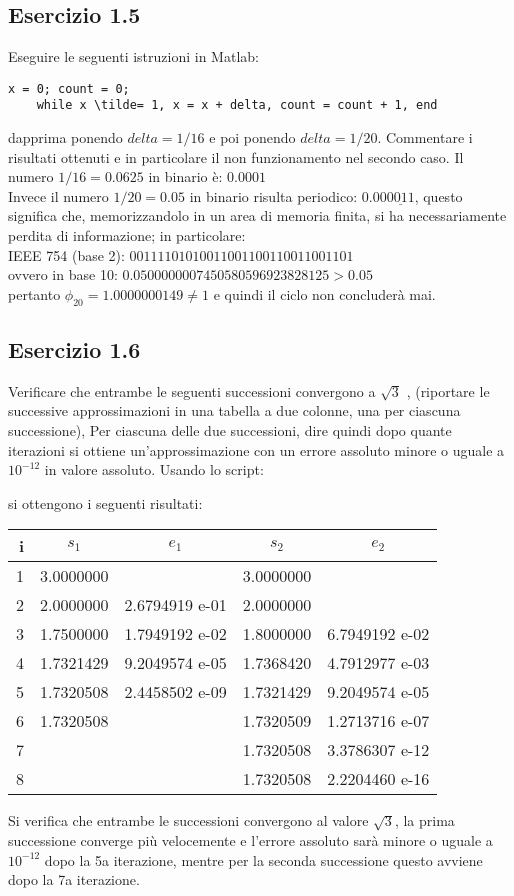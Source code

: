 	\subsection{Esercizio 1.5}
Eseguire le seguenti istruzioni in Matlab:
\begin{lstlisting}[frame=single]
	x = 0; count = 0;	
	while x \tilde= 1, x = x + delta, count = count + 1, end
\end{lstlisting}
dapprima ponendo $delta = 1/16$ e poi ponendo $delta = 1/20$. Commentare i risultati ottenuti e in particolare il non funzionamento nel secondo caso.
\PP
Il numero $1/16 = 0.0625$ in binario è: $0.0001$\\
Invece il numero $1/20 = 0.05$ in binario risulta periodico: $0.00\underline{0011}$, questo significa che, memorizzandolo in un area di memoria finita, si ha necessariamente perdita di informazione; in particolare:\\
IEEE 754 (base 2): $00111101010011001100110011001101$\\
ovvero in base 10: $0.0500000007450580596923828125 > 0.05$\\
pertanto $\phi_{20} = 1.0000000149 \neq 1$ e quindi il ciclo non concluderà mai.

	\subsection{Esercizio 1.6}
Verificare che entrambe le seguenti successioni convergono a $\sqrt{3}$ , (riportare le successive approssimazioni in una tabella a due colonne, una per ciascuna successione),
Per ciascuna delle due successioni, dire quindi dopo quante iterazioni si ottiene un’approssimazione con un errore assoluto minore o uguale a $10^{-12}$ in valore assoluto.
\PP
Usando lo script:

si ottengono i seguenti risultati:

\begin{tabular}{ r | c | c | c | c }
		
  \textbf{i} & \textbf{$s_1$} & \textbf{$e_1$} & \textbf{$s_2$} & \textbf{$e_2$} \\
  \hline	
  	1 & 3.0000000 &                & 3.0000000 &               \\
	2 & 2.0000000 & 2.6794919 e-01 & 2.0000000 &               \\
	3 & 1.7500000 & 1.7949192 e-02 & 1.8000000 & 6.7949192 e-02\\
	4 & 1.7321429 & 9.2049574 e-05 & 1.7368420 & 4.7912977 e-03\\
	5 & 1.7320508 & 2.4458502 e-09 & 1.7321429 & 9.2049574 e-05\\
	6 & 1.7320508 &                & 1.7320509 & 1.2713716 e-07\\
	7 &           &                & 1.7320508 & 3.3786307 e-12\\
	8 &           &                & 1.7320508 & 2.2204460 e-16\\
  \hline  
\end{tabular}

Si verifica che entrambe le successioni convergono al valore $\sqrt{3}$, la prima successione converge più velocemente e l'errore assoluto sarà minore o uguale a $10^{-12}$ dopo la 5a iterazione, mentre per la seconda successione questo avviene dopo la 7a iterazione.
